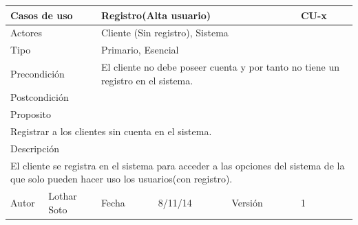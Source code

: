 \documentclass{article}
\begin{document}
\begin{table}[h]
\begin{tabular}{|l|l|l|l|l|l|}
\hline
\multicolumn{2}{|p{2cm}|}{Casos de uso}  & \multicolumn{3}{p{7cm}|}{\textbf{Registro(Alta usuario)}} & CU-x \\
\hline
\multicolumn{2}{|p{2cm}|}{Actores}       & \multicolumn{4}{p{8cm}|}{Cliente (Sin registro), Sistema}        \\
\hline
\multicolumn{2}{|p{2cm}|}{Tipo}          & \multicolumn{4}{p{8cm}|}{Primario, Esencial}        \\
\hline
\multicolumn{2}{|p{2cm}|}{Precondición}  & \multicolumn{4}{p{8cm}|}{El cliente no debe poseer cuenta y por tanto no tiene un registro en el sistema.}        \\
\hline
\multicolumn{2}{|p{2cm}|}{Postcondición} & \multicolumn{4}{p{8cm}|}{}        \\
\hline
\multicolumn{6}{|p{10cm}|}{Proposito}                                   \\
\hline
\multicolumn{6}{|p{10cm}|}{Registrar a los clientes sin cuenta en el sistema.}                                            \\
\hline
\multicolumn{6}{|p{10cm}|}{Descripción}                                 \\
\hline
\multicolumn{6}{|p{10cm}|}{El cliente se registra en el sistema para acceder a las opciones del sistema de la que solo pueden hacer uso los usuarios(con registro).}                                            \\
\hline
Autor              &     Lothar Soto         & Fecha    &  8/11/14   &   Versión  & 1\\     
\hline
\end{tabular}
\end{table}
\end{document}
